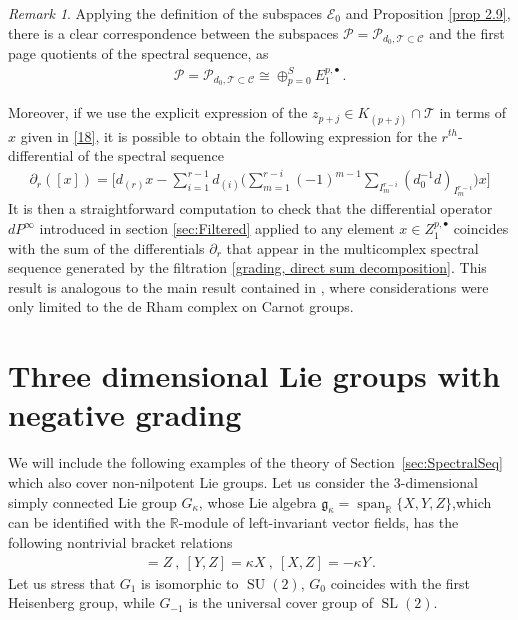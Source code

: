\documentclass[10pt]{amsart}
\newcounter{dummy} \numberwithin{dummy}{section}
\theoremstyle{remark}
\newtheorem{remark}[dummy]{Remark}
\DeclareMathOperator{\spn}{span}
\DeclareMathOperator{\SU}{SU}
\DeclareMathOperator{\SL}{SL}
\numberwithin{equation}{section}
\begin{document}
\begin{remark}
Applying the definition of the subspaces $\mathcal{E}_0$ and Proposition \ref{prop 2.9}, there is a clear correspondence between the subspaces $\mathcal{P}=\mathcal{P}_{d_0,\mathcal{T}\subset\mathcal{C}}$ and the first page quotients of the spectral sequence, as
\begin{align*}
    \mathcal{P}=\mathcal{P}_{d_0,\mathcal{T}\subset\mathcal{C}}\cong \oplus_{p=0}^S E^{p,\bullet}_1\,.
\end{align*}


    Moreover, if we use the explicit expression of the $z_{p+j}\in K_{(p+j)}\cap\mathcal{T}$ in terms of $x$ given in \eqref{18}, it is possible to obtain the following expression for the $r^{th}$-differential of the spectral sequence
    \begin{align*}
        \partial_r([x])=\bigg[d_{(r)}x-\sum_{i=1}^{r-1}d_{(i)}\bigg(\sum_{m=1}^{r-i}(-1)^{m-1}\sum_{I_m^{r-i}}(d_0^{-1}d)_{I_m^{r-i}}\bigg)x\bigg]
    \end{align*}
    It is then a straightforward computation to check that the differential operator $dP^\infty$ introduced in section \ref{sec:Filtered} applied to any element $x\in Z_1^{p,\bullet}$ coincides with the sum of the differentials $\partial_r$ that appear in the multicomplex spectral sequence
generated by the filtration \eqref{grading, direct sum decomposition}. This result is analogous to the main result contained in \cite{lerario2023multicomplexes}, where considerations were only limited to the de Rham complex on Carnot groups.
\end{remark}




\section{Three dimensional Lie groups with negative grading}\label{last section}
We will include the following examples of the theory of Section~\ref{sec:SpectralSeq} which also cover non-nilpotent Lie groups.
Let us consider the 3-dimensional simply connected Lie group $G_\kappa$, whose Lie algebra $\mathfrak{g}_\kappa=\spn_{\mathbb R}\lbrace X,Y,Z\rbrace$,which can be identified with the $\mathbb{R}$-module of left-invariant vector fields, has the following nontrivial bracket relations
\begin{align*}
    [X,Y]=Z\ ,\ [Y,Z]=\kappa X\ ,\ [X,Z]=-\kappa Y\,.
\end{align*}
Let us stress that $G_1$ is isomorphic to $\SU(2)$, $G_0$ coincides with the first Heisenberg group, while $G_{-1}$ is the universal cover group of $\SL(2)$.
\end{document}
